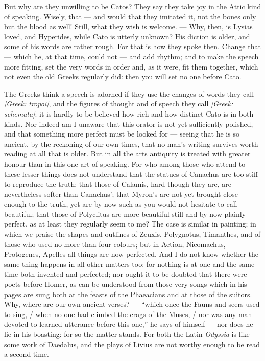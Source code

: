 But why are they unwilling to be Catos? They say they take joy in the Attic kind of speaking. Wisely, that — and would that they imitated it, not the bones only but the blood as well! Still, what they wish is welcome. — Why, then, is Lysias loved, and Hyperides, while Cato is utterly unknown? His diction is older, and some of his words are rather rough. For that is how they spoke then. Change that — which he, at that time, could not — and add rhythm; and to make the speech more fitting, set the very words in order and, as it were, fit them together, which not even the old Greeks regularly did: then you will set no one before Cato.

 The Greeks think a speech is adorned if they use the changes of words they call \textit{[Greek: tropoi]}, and the figures of thought and of speech they call \textit{[Greek: schēmata]}: it is hardly to be believed how rich and how distinct Cato is in both kinds. Nor indeed am I unaware that this orator is not yet sufficiently polished, and that something more perfect must be looked for — seeing that he is so ancient, by the reckoning of our own times, that no man's writing survives worth reading at all that is older. But in all the arts antiquity is treated with greater honour than in this one art of speaking. For who among those who attend to these lesser things does not understand that the statues of Canachus are too stiff to reproduce the truth; that those of Calamis, hard though they are, are nevertheless softer than Canachus'; that Myron's are not yet brought close enough to the truth, yet are by now such as you would not hesitate to call beautiful; that those of Polyclitus are more beautiful still and by now plainly perfect, as at least they regularly seem to me? The case is similar in painting; in which we praise the shapes and outlines of Zeuxis, Polygnotus, Timanthes, and of those who used no more than four colours; but in Aetion, Nicomachus, Protogenes, Apelles all things are now perfected. And I do not know whether the same thing happens in all other matters too: for nothing is at one and the same time both invented and perfected; nor ought it to be doubted that there were poets before Homer, as can be understood from those very songs which in his pages are sung both at the feasts of the Phaeacians and at those of the suitors. Why, where are our own ancient verses? — ``which once the Fauns and seers used to sing, / when no one had climbed the crags of the Muses, / nor was any man devoted to learned utterance before this one,'' he says of himself — nor does he lie in his boasting: for so the matter stands. For both the Latin \textit{Odyssia} is like some work of Daedalus, and the plays of Livius are not worthy enough to be read a second time.

